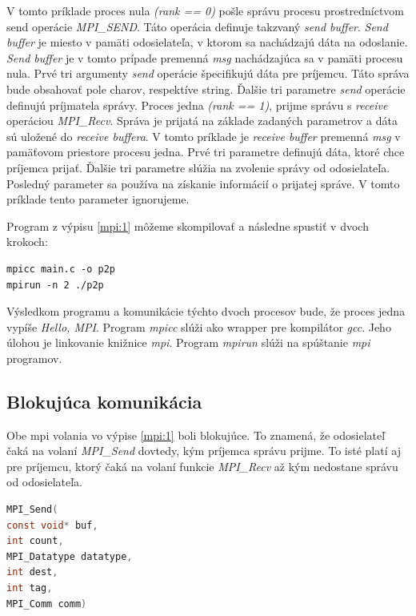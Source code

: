 V tomto príklade proces nula \textit{(rank == 0)} pošle správu procesu prostredníctvom send operácie \textit{MPI\_SEND}.
Táto operácia definuje takzvaný \textit{send buffer}. \textit{Send buffer} je miesto v pamäti
odosielateľa, v ktorom sa nachádzajú dáta na odoslanie.
\textit{Send buffer} je v tomto prípade premenná \textit{msg} nachádzajúca sa v pamäti procesu nula.
Prvé tri argumenty \textit{send} operácie špecifikujú dáta pre príjemcu. Táto správa bude obsahovať pole charov, respektíve string.
Ďalšie tri parametre \textit{send} operácie definujú príjmatela správy.
Proces jedna \textit{(rank == 1)}, prijme správu s \textit{receive} operáciou \textit{MPI\_Recv}.
Správa je prijatá na základe zadaných parametrov a dáta sú uložené do \textit{receive buffera}.
V tomto príklade je \textit{receive buffer} premenná \textit{msg} v pamäťovom priestore procesu jedna.
Prvé tri parametre definujú dáta, ktoré chce príjemca prijať. Ďalšie tri parametre slúžia na zvolenie správy od odosielateľa.
Posledný parameter sa používa na získanie informácií o prijatej správe. V tomto príklade tento parameter ignorujeme.

Program z výpisu \ref{mpi:1} môžeme skompilovať a následne spustiť v dvoch krokoch:
\begin{lstlisting}
mpicc main.c -o p2p
mpirun -n 2 ./p2p
\end{lstlisting}
Výsledkom programu a komunikácie týchto dvoch procesov bude, že proces jedna vypíše \textit{Hello, MPI}. Program \textit{mpicc} slúži ako wrapper pre kompilátor \textit{gcc}. Jeho úlohou je linkovanie knižnice \textit{mpi}. Program \textit{mpirun} slúži na spúštanie \textit{mpi} programov.

\subsection{Blokujúca komunikácia}
Obe \acrshort{mpi} volania vo výpise \ref{mpi:1} boli blokujúce.
To znamená, že odosielateľ čaká na volaní \textit{MPI\_Send} dovtedy, kým príjemca správu prijme.
To isté platí aj pre príjemcu, ktorý čaká na volaní funkcie \textit{MPI\_Recv}  až kým nedostane správu od odosielateľa.

\begin{lstlisting}[language=c, caption={MPI\_Send}, label={mpi:send}]
MPI_Send(
const void* buf,
int count,
MPI_Datatype datatype,
int dest,
int tag,
MPI_Comm comm)
\end{lstlisting}

